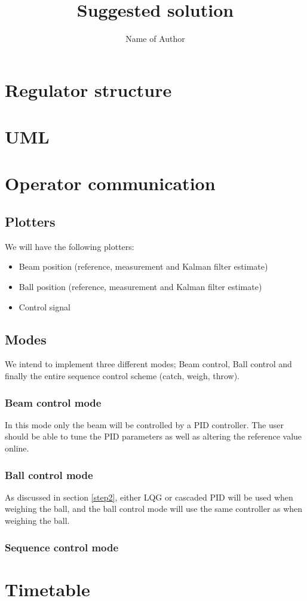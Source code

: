 \documentclass{article}
\title{Suggested solution}
\author{Name of Author}
\begin{document}
\maketitle

\section{Regulator structure}


\section{UML}


\section{Operator communication}
\subsection{Plotters}
We will have the following plotters:
\begin{itemize}
\item Beam position (reference, measurement and Kalman filter estimate)
\item Ball position (reference, measurement and Kalman filter estimate)
\item Control signal
\end{itemize}

\subsection{Modes}
We intend to implement three different modes; Beam control, Ball control and finally the entire sequence control scheme (catch, weigh, throw).
\subsubsection{Beam control mode}
In this mode only the beam will be controlled by a PID controller. The user should be able to tune the PID parameters as well as altering the reference value online.

\subsubsection{Ball control mode}
As discussed in section \ref{step2}, either LQG or cascaded PID will be used when weighing the ball, and the ball control mode will use the same controller as when weighing the ball.



\subsubsection{Sequence control mode}

\section{Timetable}
\end{document}
